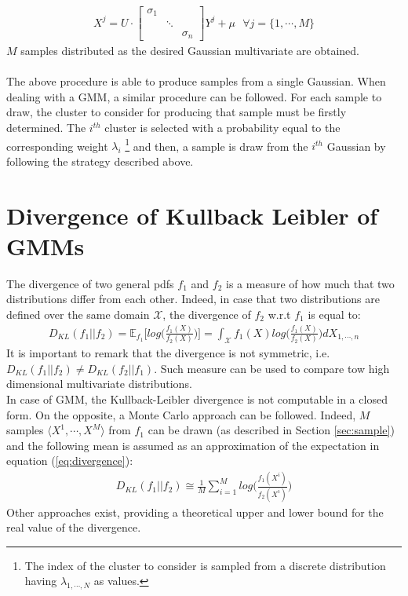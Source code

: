 \documentclass{article}
\begin{document}
\begin{eqnarray}
X^j = U \cdot  \begin{bmatrix}
\sigma_1 &  & \\ 
 & \ddots & \\ 
 &  & \sigma_n
\end{bmatrix}  Y^j + \mu \,\,\,\, \forall j=\lbrace 1,\cdots ,M \rbrace
\end{eqnarray}
$M$ samples distributed as the desired Gaussian multivariate are obtained.
\\
\\
The above procedure is able to produce samples from a single Gaussian. When dealing with a GMM, a similar procedure can be followed. For each sample to draw, the cluster to consider for producing that sample must be firstly determined. The $i^{th}$ cluster is selected with a probability equal to the corresponding weight $\lambda_i$ \footnote{The index of the cluster to consider is sampled from a discrete distribution having $\lambda_{1,\cdots,N}$ as values.} and then, a sample is draw from the $i^{th}$ Gaussian by following the strategy described above.

\section{Divergence of Kullback Leibler of GMMs}

The divergence of two general pdfs $f_1$ and $f_2$ is a measure of how much that two distributions differ from each other. Indeed, in case that two distributions are defined over the same domain $\mathcal{X}$, the divergence of $f_2$ w.r.t $f_1$ is equal to:
\begin{eqnarray}
D_{KL}(f_1 || f_2) = 
\mathbb{E}_{f_1}\bigg[ log \bigg( \frac{f_1(X)}{f_2(X)} \bigg) \bigg] = \int _{\mathcal{X}} f_1(X) log \bigg( \frac{f_1(X)}{f_2(X)} \bigg) dX_{1,\cdots,n}   
\label{eq:divergence}
\end{eqnarray}
It is important to remark that the divergence is not symmetric, i.e. $D_{KL}(f_1 || f_2) \neq D_{KL}(f_2 || f_1)$.
Such measure can be used to compare tow high dimensional multivariate distributions.
\\
In case of GMM, the Kullback-Leibler divergence is not computable in a closed form. 
On the opposite, a Monte Carlo approach can be followed. Indeed, $M$ samples $\langle X^1, \cdots , X^M \rangle$ from $f_1$ can be drawn (as described in Section \ref{sec:sample}) and the following mean is assumed as an approximation of the expectation in equation (\ref{eq:divergence}):
\begin{eqnarray}
D_{KL}(f_1 || f_2) \cong \frac{1}{M} \sum_{i=1}^M log \bigg( \frac{f_1(X^i)}{f_2(X^i)} \bigg) 
\end{eqnarray}
Other approaches exist, providing a theoretical upper and lower bound for the real value of the divergence.
\end{document}

